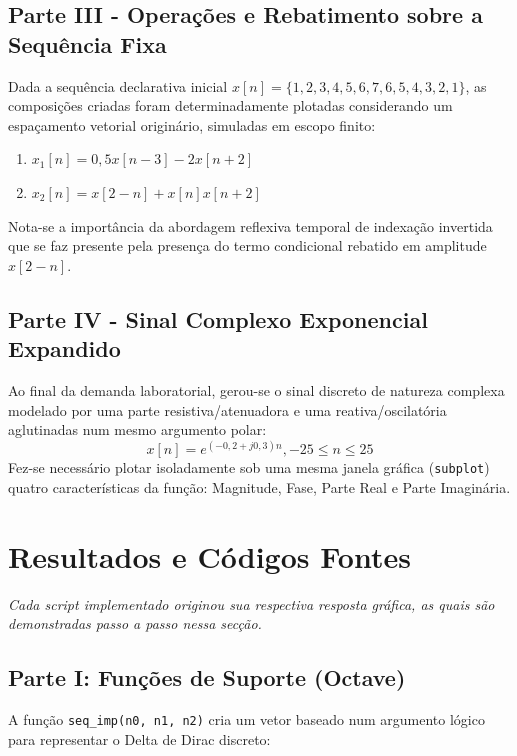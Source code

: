 \documentclass[tcc]{classe_uftex/uftex}
\begin{document}
\section{Parte III - Operações e Rebatimento sobre a Sequência Fixa}
Dada a sequência declarativa inicial $x[n] = \{1,2,3,4,5,6,7,6,5,4,3,2,1\}$, as composições criadas foram determinadamente plotadas considerando um espaçamento vetorial originário, simuladas em escopo finito:
\begin{enumerate}
    \item[\textbf{a)}] $x_1[n] = 0,5x[n - 3] - 2x[n + 2]$
    \item[\textbf{b)}] $x_2[n] = x[2 - n] + x[n]x[n + 2]$
\end{enumerate}

Nota-se a importância da abordagem reflexiva temporal de indexação invertida que se faz presente pela presença do termo condicional rebatido em amplitude $x[2-n]$.

\section{Parte IV - Sinal Complexo Exponencial Expandido}
Ao final da demanda laboratorial, gerou-se o sinal discreto de natureza complexa modelado por uma parte resistiva/atenuadora e uma reativa/oscilatória aglutinadas num mesmo argumento polar:
\begin{equation}
    x[n] = e^{(-0,2+j0,3)n} , -25 \leq n \leq 25 \nonumber
\end{equation}
Fez-se necessário plotar isoladamente sob uma mesma janela gráfica (\texttt{subplot}) quatro características da função: Magnitude, Fase, Parte Real e Parte Imaginária.

\chapter{Resultados e Códigos Fontes}

\textit{Cada script implementado originou sua respectiva resposta gráfica, as quais são demonstradas passo a passo nessa secção.}

\section{Parte I: Funções de Suporte (Octave)}

A função \texttt{seq\_imp(n0, n1, n2)} cria um vetor baseado num argumento lógico para representar o Delta de Dirac discreto:

\end{document}
